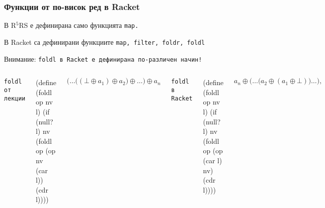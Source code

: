\documentclass{beamer}
\begin{document}
\begin{frame}[fragile]
  \frametitle{Функции от по-висок ред в Racket}

  В R$^5$RS е дефинирана само функцията \tt{map}.

  В Racket са дефинирани функциите \tt{map}, \tt{filter}, \tt{foldr}, \tt{foldl}

  \pause
  \vspace{1em}

  \alert{Внимание: \tt{foldl} в Racket е дефинирана по-различен начин!}

  \pause

  \begin{columns}[t,onlytextwidth]
    \small

    \tt{foldl} от лекции

\begin{semiverbatim}
(define (foldl op nv l)
  (if (null? l) nv
      (foldl op \alert{(op nv (car l))}
             (cdr l))))
\end{semiverbatim}

    \begin{equation*}
      \Big(\ldots\big((\bot \oplus a_1) \oplus a_2\big) \oplus \ldots\Big) \oplus a_n
    \end{equation*}


    \tt{foldl} в Racket

\begin{semiverbatim}
(define (foldl op nv l)
  (if (null? l) nv
      (foldl op \alert{(op (car l) nv)}
             (cdr l))))
\end{semiverbatim}

    \begin{equation*}
      a_n \oplus \Big(\ldots \big(a_2 \oplus (a_1 \oplus \bot)\big)\ldots\Big),
    \end{equation*}

  \end{columns}
\end{frame}
\end{document}
